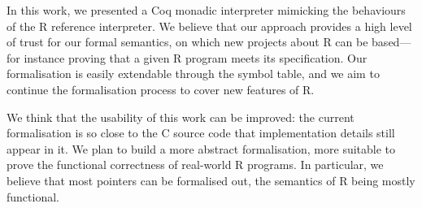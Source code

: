\documentclass[9pt, sigplan, natbib=false, screen=true]{acmart}
\newcommand\Coq{Coq}
\newcommand\R{R}
\newcommand\Cn{C}
\begin{document}
In this work, we presented a \Coq{} monadic interpreter
mimicking the behaviours of the \R{} reference interpreter.
We believe that our approach provides a high level of trust
for our formal semantics,
on which new projects about \R{} can be based---%
for instance
proving that a given \R{} program meets its specification.
Our formalisation is easily extendable through the symbol table,
and we aim to continue the formalisation process
to cover new features of \R{}.

We think that the usability of this work can be improved:
the current formalisation is so close to the C source code
that implementation details still appear in it.
We plan to build a more abstract formalisation,
more suitable to prove the functional correctness of real-world \R{} programs.
In particular, we believe that most pointers
can be formalised out,
the semantics of \R{} being mostly functional.

%
%
%
%


\printbibliography
\end{document}
